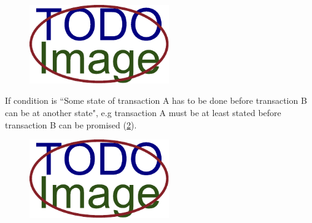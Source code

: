 \begin{figure}
  \centering
  \includegraphics[width=6cm,keepaspectratio]{img/TODO-image}
  \caption{}
  \label{fig:request-start-condition}
\end{figure}  

If condition is ``Some state of transaction A has to be done before transaction B can be at another state", e.g transaction A must be at least stated before transaction B can be promised (\cref{fig:state-state-condition}).

\begin{figure}
  \centering
  \includegraphics[width=6cm,keepaspectratio]{img/TODO-image}
  \caption{}
  \label{fig:state-state-condition}
\end{figure}  

